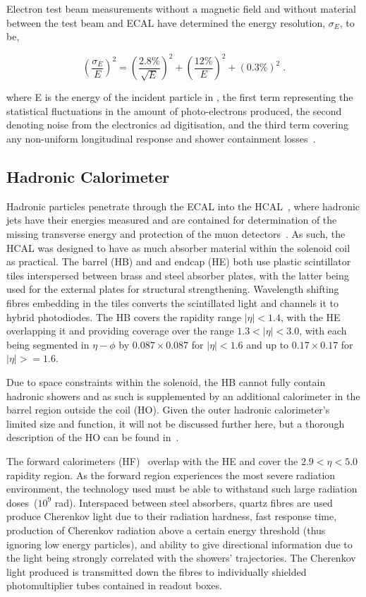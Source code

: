Electron test beam measurements without a magnetic field and without material between the test beam and ECAL have determined the energy resolution, $\sigma_{E}$, to be,

\begin{equation}
(\frac{\sigma_{E}}{E})^{2} = (\frac{2.8\%}{\sqrt{E}})^{2} + (\frac{12\%}{E})^{2} + (0.3\%)^{2} \;.
\label{eq:ecalResolution}
\end{equation}

where E is the energy of the incident particle in \GeV, the first term representing the statistical fluctuations in the amount of photo-electrons produced, the second denoting noise from the electronics ad digitisation, and the third term covering any non-uniform longitudinal response and shower containment losses~\cite{Adzic:2007mi}.

\subsection{Hadronic Calorimeter}\label{subsec:HCAL}
Hadronic particles penetrate through the ECAL into the HCAL~\cite{CMS:1997xji}, where hadronic jets have their energies measured and are contained for determination of the missing transverse energy and protection of the muon detectors~\cite{HCAL:tdr}.
As such, the HCAL was designed to have as much absorber material within the solenoid coil as practical. 
The barrel (HB) and and endcap (HE) both use plastic scintillator tiles interspersed between brass and steel absorber plates, with the latter being used for the external plates for structural strengthening.
Wavelength shifting fibres embedding in the tiles converts the scintillated light and channels it to hybrid photodiodes.
The HB covers the rapidity range $|\eta| < 1.4$, with the HE overlapping it and providing coverage over the range $1.3 < |\eta| < 3.0$, with each being segmented in $\eta - \phi$ by $0.087 \times 0.087$ for $| \eta | < 1.6$ and up to $0.17 \times 0.17$ for $| \eta | >= 1.6$.

Due to space constraints within the solenoid, the HB cannot fully contain hadronic showers and as such is supplemented by an additional calorimeter in the barrel region outside the coil (HO). Given the outer hadronic calorimeter's limited size and function, it will not be discussed further here, but a thorough description of the HO can be found in~\cite{HO}.

The forward calorimeters (HF)~\cite{HF} overlap with the HE and cover the $2.9 < \eta < 5.0$ rapidity region.
As the forward region experiences the most severe radiation environment, the technology used must be able to withstand such large radiation doses~($10^{9}$ rad). 
Interspaced between steel absorbers, quartz fibres are used produce Cherenkov light due to their radiation hardness, fast response time, production of Cherenkov radiation above a certain energy threshold (thus ignoring low energy particles), and ability to give directional information due to the light being strongly correlated with the showers' trajectories.
The Cherenkov light produced is transmitted down the fibres to individually shielded photomultiplier tubes contained in readout boxes.

